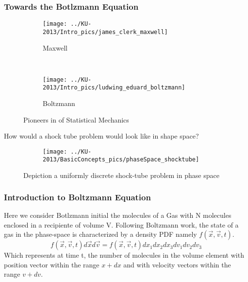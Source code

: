 \begin{frame} \frametitle{Towards the Botlzmann Equation}
  \begin{figure}
        \centering
        \begin{subfigure}[b]{0.30\textwidth}
                \centering
                \texttt{[image: ../KU-2013/Intro\_pics/james\_clerk\_maxwell]}
                \caption{Maxwell}
                \label{fig:james_clerk_maxwell}
        \end{subfigure}%
        ~ %
        \begin{subfigure}[b]{0.30\textwidth}
                \centering
                \texttt{[image: ../KU-2013/Intro\_pics/ludwing\_eduard\_boltzmann]}
                \caption{Boltzmann}
                \label{fig:ludwing_eduard_boltzmann}
        \end{subfigure}
        \caption{Pioneers in of Statistical Mechanics}
	\label{fig:Maxwell-Boltzmann}
 \end{figure}
\end{frame}

\begin{frame}
How would a shock tube problem would look like in shape space?
 \begin{figure}
        \centering
        \begin{subfigure}[b]{0.60\textwidth}
                \centering
                \texttt{[image: ../KU-2013/BasicConcepts\_pics/phaseSpace\_shocktube]}
        \end{subfigure}%
        \caption{Depiction a uniformly discrete shock-tube problem in phase space}
        \label{fig:shocktube_dx}
 \end{figure}
\end{frame}

\begin{frame} \frametitle{Introduction to Boltzmann Equation}
 Here we consider Botlzmann initial the molecules of a Gas with N molecules enclosed in a recipiente of volume V.
 Following Boltzmann work, the state of a gas in the phase-space is characterized by a density PDF namely $f(\vec{x},\vec{v},t)$.
 \begin{equation}
  f(\vec{x},\vec{v},t) d\vec{x} d\vec{v} = f(\vec{x},\vec{v},t) dx_1 dx_2 dx_3 dv_1 dv_2 dv_3 
 \end{equation}
  Which represents at time t, the number of molecules in the volume element with position vector within the range $x + dx$ and with velocity vectors within the range $v + dv$.
\end{frame}

